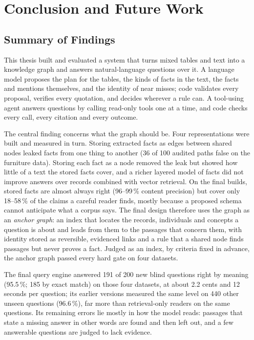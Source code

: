 \chapter{Conclusion and Future Work}\label{ch09}

\section{Summary of Findings}\label{sec:ch09-summary}

This thesis built and evaluated a system that turns mixed tables and text into a knowledge graph and answers
natural-language questions over it. A language model proposes the plan for the tables, the kinds of facts in the
text, the facts and mentions themselves, and the identity of near misses; code validates every proposal, verifies
every quotation, and decides wherever a rule can. A tool-using agent answers questions by calling read-only tools one
at a time, and code checks every call, every citation and every outcome.

The central finding concerns what the graph should be. Four representations were built and measured in turn. Storing
extracted facts as edges between shared nodes leaked facts from one thing to another (36 of 100 audited paths false
on the furniture data). Storing each fact as a node removed the leak but showed how little of a text the stored facts
cover, and a richer layered model of facts did not improve answers over records combined with vector retrieval. On
the final builds, stored facts are almost always right (96--99\,\% content precision) but cover only 18--58\,\% of the
claims a careful reader finds, mostly because a proposed schema cannot anticipate what a corpus says. The final design
therefore uses the graph as an \emph{anchor graph}: an index that locates the records, individuals and concepts a
question is about and leads from them to the passages that concern them, with identity stored as reversible,
evidenced links and a rule that a shared node finds passages but never proves a fact. Judged as an index, by criteria
fixed in advance, the anchor graph passed every hard gate on four datasets.

The final query engine answered 191 of 200 new blind questions right by meaning (95.5\,\%; 185 by exact match) on those
four datasets, at about 2.2 cents and 12 seconds per question; its earlier versions measured the same level on 440
other unseen questions (96.6\,\%), far more than retrieval-only readers on the same questions. Its remaining errors lie
mostly in how the model reads: passages that state a missing answer in other words are found and then left out, and
a few answerable questions are judged to lack evidence.

